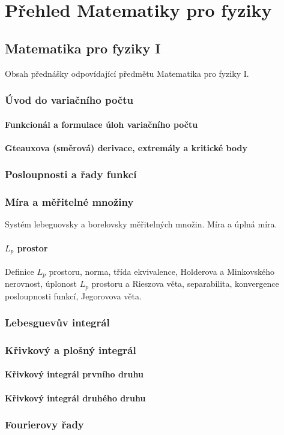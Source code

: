 \part{Přehled Matematiky pro fyziky}

\chapter{Matematika pro fyziky I}

Obsah přednášky odpovídající předmětu Matematika pro fyziky I.

\section{Úvod do variačního počtu}

\subsection{Funkcionál a formulace úloh variačního počtu}
\subsection{Gteauxova (směrová) derivace, extremály a kritické body}

\section{Posloupnosti a řady funkcí}

\section{Míra a měřitelné množiny}

Systém lebeguovsky a borelovsky měřitelných množin. Míra a úplná míra.

\subsection{$L_p$ prostor}
Definice $L_p$ prostoru, norma, třída ekvivalence, Holderova a Minkovského nerovnost, úplonost $L_p$ prostoru a Rieszova věta, separabilita, konvergence posloupnosti funkcí, Jegorovova věta.

\section{Lebesguevův integrál}

\section{Křivkový a plošný integrál}
\subsection{Křivkový integrál prvního druhu}
\subsection{Křivkový integrál druhého druhu}

\section{Fourierovy řady}
\subsection{}
